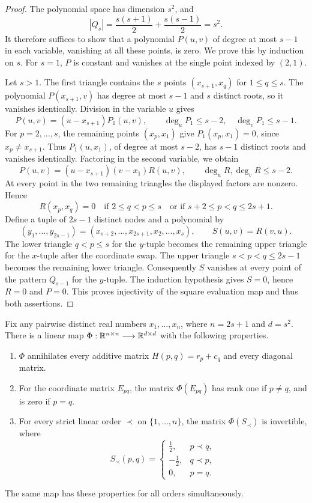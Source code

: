 \begin{proof}
The polynomial space has dimension $s^2$, and
\[
  |Q_s|=\frac{s(s+1)}2+\frac{s(s-1)}2=s^2.
\]
It therefore suffices to show that a polynomial $P(u,v)$ of degree at
most $s-1$ in each variable, vanishing at all these points, is zero.
We prove this by induction on $s$.  For $s=1$, $P$ is constant and
vanishes at the single point indexed by $(2,1)$.

Let $s>1$.  The first triangle contains the $s$ points
$(x_{s+1},x_q)$ for $1\leq q\leq s$.  The polynomial
$P(x_{s+1},v)$ has degree at most $s-1$ and $s$ distinct roots, so it
vanishes identically.  Division in the variable $u$ gives
\[
  P(u,v)=(u-x_{s+1})P_1(u,v),
  \qquad \deg_u P_1\leq s-2,\quad\deg_v P_1\leq s-1.
\]
For $p=2,\ldots,s$, the remaining points $(x_p,x_1)$ give
$P_1(x_p,x_1)=0$, since $x_p\ne x_{s+1}$.  Thus
$P_1(u,x_1)$, of degree at most $s-2$, has $s-1$ distinct roots and
vanishes identically.  Factoring in the second variable, we obtain
\begin{equation}
\label{eq:triangle-factorization}
  P(u,v)=(u-x_{s+1})(v-x_1)R(u,v),
  \qquad \deg_u R,\deg_v R\leq s-2.
\end{equation}
At every point in the two remaining triangles the displayed factors
are nonzero.  Hence
\[
  R(x_p,x_q)=0
  \quad\text{if }2\leq q<p\leq s
  \quad\text{or if }s+2\leq p<q\leq2s+1.
\]
Define a tuple of $2s-1$ distinct nodes and a polynomial by
\[
  (y_1,\ldots,y_{2s-1})
   =(x_{s+2},\ldots,x_{2s+1},x_2,\ldots,x_s),
  \qquad S(u,v)=R(v,u).
\]
The lower triangle $q<p\leq s$ for the $y$-tuple becomes the remaining
upper triangle for the $x$-tuple after the coordinate swap.  The upper
triangle $s<p<q\leq2s-1$ becomes the remaining lower triangle.
Consequently $S$ vanishes at every point of the pattern $Q_{s-1}$ for
the $y$-tuple.  The induction hypothesis gives $S=0$, hence $R=0$ and
$P=0$.  This proves injectivity of the square evaluation map and thus
both assertions.
\end{proof}

\begin{lemma}
\label{lem:detector}
Fix any pairwise distinct real numbers $x_1,\ldots,x_n$, where
$n=2s+1$ and $d=s^2$.  There is a linear map
$\Phi:\mathbb R^{n\times n}\longrightarrow\mathbb R^{d\times d}$ with the following
properties.
\begin{enumerate}[label=\textup{(\roman*)}]
\item $\Phi$ annihilates every additive matrix
$H(p,q)=r_p+c_q$ and every diagonal matrix.
\item For the coordinate matrix $E_{pq}$, the matrix $\Phi(E_{pq})$
has rank one if $p\ne q$, and is zero if $p=q$.
\item For every strict linear order $\prec$ on $\{1,\ldots,n\}$, the
matrix $\Phi(S_\prec)$ is invertible, where
\[
  S_\prec(p,q)=
  \begin{cases}
    \tfrac12,&p\prec q,\\
    -\tfrac12,&q\prec p,\\
    0,&p=q.
  \end{cases}
\]
\end{enumerate}
The same map has these properties for all orders simultaneously.
\end{lemma}

